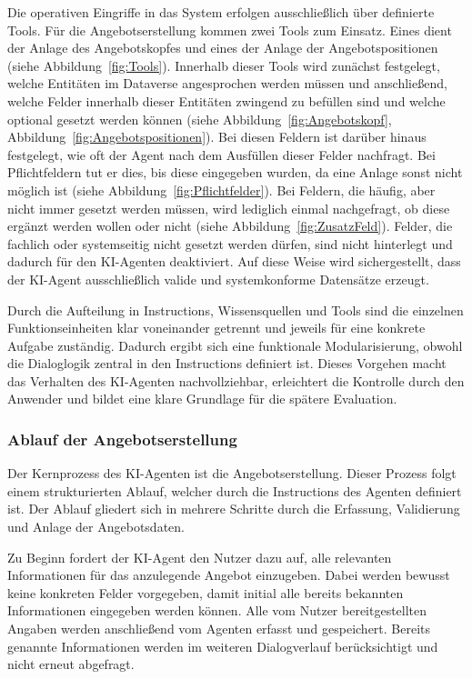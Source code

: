 Die operativen Eingriffe in das System erfolgen ausschließlich über definierte Tools. Für die Angebotserstellung kommen zwei Tools zum Einsatz. Eines dient der Anlage des Angebotskopfes und eines der Anlage der Angebotspositionen (siehe Abbildung~\ref{fig:Tools}). Innerhalb dieser Tools wird zunächst festgelegt, welche Entitäten im Dataverse angesprochen werden müssen und anschließend, welche Felder innerhalb dieser Entitäten zwingend zu befüllen sind und welche optional gesetzt werden können (siehe Abbildung~\ref{fig:Angebotskopf}, Abbildung~\ref{fig:Angebotspositionen}). Bei diesen Feldern ist darüber hinaus festgelegt, wie oft der Agent nach dem Ausfüllen dieser Felder nachfragt. Bei Pflichtfeldern tut er dies, bis diese eingegeben wurden, da eine Anlage sonst nicht möglich ist (siehe Abbildung~\ref{fig:Pflichtfelder}). Bei Feldern, die häufig, aber nicht immer gesetzt werden müssen, wird lediglich einmal nachgefragt, ob diese ergänzt werden wollen oder nicht (siehe Abbildung~\ref{fig:ZusatzFeld}). Felder, die fachlich oder systemseitig nicht gesetzt werden dürfen, sind nicht hinterlegt und dadurch für den \ac{KI}-Agenten deaktiviert. Auf diese Weise wird sichergestellt, dass der \ac{KI}-Agent ausschließlich valide und systemkonforme Datensätze erzeugt.

Durch die Aufteilung in Instructions, Wissensquellen und Tools sind die einzelnen Funktionseinheiten klar voneinander getrennt und jeweils für eine konkrete Aufgabe zuständig. Dadurch ergibt sich eine funktionale Modularisierung, obwohl die Dialoglogik zentral in den Instructions definiert ist. Dieses Vorgehen macht das Verhalten des \ac{KI}-Agenten nachvollziehbar, erleichtert die Kontrolle durch den Anwender und bildet eine klare Grundlage für die spätere Evaluation.

\subsubsection{Ablauf der Angebotserstellung}
Der Kernprozess des \ac{KI}-Agenten ist die Angebotserstellung. Dieser Prozess folgt einem strukturierten Ablauf, welcher durch die Instructions des Agenten definiert ist. Der Ablauf gliedert sich in mehrere Schritte durch die Erfassung, Validierung und Anlage der Angebotsdaten. 

Zu Beginn fordert der \ac{KI}-Agent den Nutzer dazu auf, alle relevanten Informationen für das anzulegende Angebot einzugeben. Dabei werden bewusst keine konkreten Felder vorgegeben, damit initial alle bereits bekannten Informationen eingegeben werden können. Alle vom Nutzer bereitgestellten Angaben werden anschließend vom Agenten erfasst und gespeichert. Bereits genannte Informationen werden im weiteren Dialogverlauf berücksichtigt und nicht erneut abgefragt.

